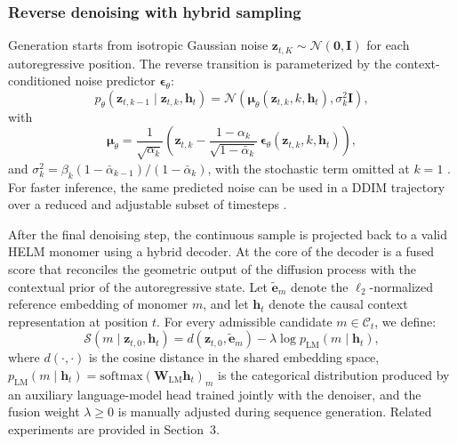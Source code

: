 \begin{methods}
\subsubsection{Reverse denoising with hybrid sampling}\label{subsubsec:reverse_hybrid_sampling}

Generation starts from isotropic Gaussian noise $\mathbf{z}_{t,K}\sim\mathcal{N}(\mathbf{0},\mathbf{I})$ for each autoregressive position. The reverse transition is parameterized by the context-conditioned noise predictor $\boldsymbol{\epsilon}_\theta$:
\begin{equation}
p_\theta(\mathbf{z}_{t,k-1}\mid \mathbf{z}_{t,k},\mathbf{h}_t)
=\mathcal{N}\!\left(\boldsymbol{\mu}_\theta(\mathbf{z}_{t,k},k,\mathbf{h}_t),
\sigma_k^2\mathbf{I}\right),
\label{eq:ald_reverse_kernel}
\end{equation}
with
\begin{equation}
\boldsymbol{\mu}_\theta=
\frac{1}{\sqrt{\alpha_k}}\left(
\mathbf{z}_{t,k}
-\frac{1-\alpha_k}{\sqrt{1-\bar{\alpha}_k}}\,
\boldsymbol{\epsilon}_\theta(\mathbf{z}_{t,k},k,\mathbf{h}_t)
\right),
\label{eq:ald_reverse_mean}
\end{equation}
and $\sigma_k^2=\beta_k(1-\bar{\alpha}_{k-1})/(1-\bar{\alpha}_k)$, with the stochastic term omitted at $k=1$ \citep{ref_ddpm}. For faster inference, the same predicted noise can be used in a DDIM trajectory over a reduced and adjustable subset of timesteps \citep{ref_ddim}.

After the final denoising step, the continuous sample is projected back to a valid HELM monomer using a hybrid decoder. At the core of the decoder is a fused score that reconciles the geometric output of the diffusion process with the contextual prior of the autoregressive state. Let $\tilde{\mathbf{e}}_m$ denote the $\ell_2$-normalized reference embedding of monomer $m$, and let $\mathbf{h}_t$ denote the causal context representation at position $t$. For every admissible candidate $m \in \mathcal{C}_t$, we define:
\begin{equation}
\mathcal{S}(m \mid \mathbf{z}_{t,0}, \mathbf{h}_t)
= d(\mathbf{z}_{t,0}, \tilde{\mathbf{e}}_m)
- \lambda \log p_{\mathrm{LM}}(m \mid \mathbf{h}_t),
\label{eq:ald_hybrid_sampling}
\end{equation}
where $d(\cdot,\cdot)$ is the cosine distance in the shared embedding space, $p_{\mathrm{LM}}(m \mid \mathbf{h}_t)=\mathrm{softmax}(\mathbf{W}_{\mathrm{LM}}\mathbf{h}_t)_m$ is the categorical distribution produced by an auxiliary language-model head trained jointly with the denoiser, and the fusion weight $\lambda \geq 0$ is manually adjusted during sequence generation.
Related experiments are provided in Section~3.



\end{methods}
